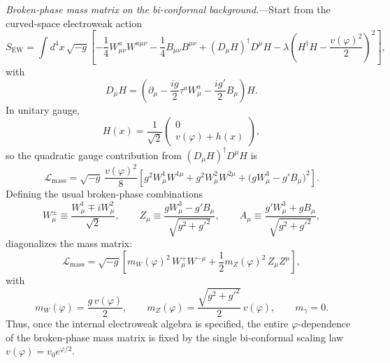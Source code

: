 \documentclass[aps,prd,onecolumn,superscriptaddress,nofootinbib,showpacs,12pt,notitlepage]{revtex4-2}
\begin{document}
\textit{Broken-phase mass matrix on the bi-conformal
background.}---Start from the curved-space electroweak action
\begin{equation}\label{eq:ew_action_bg}
  S_{\mathrm{EW}}
  = \int d^4x\,\sqrt{-g}\left[
      -\frac{1}{4}W^a_{\mu\nu}W^{a\mu\nu}
      -\frac{1}{4}B_{\mu\nu}B^{\mu\nu}
      + (D_\mu H)^\dagger D^\mu H
      - \lambda\!\left(H^\dagger H
        - \frac{v(\varphi)^2}{2}\right)^2
    \right],
\end{equation}
with
\begin{equation}\label{eq:ew_covariant_derivative}
  D_\mu H
  = \left(
      \partial_\mu
      - \frac{i g}{2}\tau^a W^a_\mu
      - \frac{i g'}{2} B_\mu
    \right)H .
\end{equation}
In unitary gauge,
\begin{equation}\label{eq:higgs_unitary_bg}
  H(x) = \frac{1}{\sqrt{2}}
  \begin{pmatrix}
    0\\
    v(\varphi) + h(x)
  \end{pmatrix},
\end{equation}
so the quadratic gauge contribution from
$(D_\mu H)^\dagger D^\mu H$ is
\begin{equation}\label{eq:ew_mass_matrix_bg}
  \mathcal{L}_{\mathrm{mass}}
  = \sqrt{-g}\,\frac{v(\varphi)^2}{8}\left[
      g^2 W_\mu^1 W^{1\mu}
      + g^2 W_\mu^2 W^{2\mu}
      + \bigl(g W_\mu^3 - g' B_\mu\bigr)^2
    \right].
\end{equation}
Defining the usual broken-phase combinations
\begin{equation}\label{eq:ew_broken_basis}
  W_\mu^\pm \equiv \frac{W_\mu^1 \mp iW_\mu^2}{\sqrt{2}},\qquad
  Z_\mu \equiv \frac{g W_\mu^3 - g' B_\mu}{\sqrt{g^2+g'^2}},\qquad
  A_\mu \equiv \frac{g' W_\mu^3 + g B_\mu}{\sqrt{g^2+g'^2}},
\end{equation}
diagonalizes the mass matrix:
\begin{equation}\label{eq:ew_mass_matrix_diag}
  \mathcal{L}_{\mathrm{mass}}
  = \sqrt{-g}\left[
      m_W(\varphi)^2\,W_\mu^+ W^{-\mu}
      + \frac{1}{2}m_Z(\varphi)^2\,Z_\mu Z^\mu
    \right],
\end{equation}
with
\begin{equation}\label{eq:ew_mass_closure}
  m_W(\varphi) = \frac{g\,v(\varphi)}{2},\qquad
  m_Z(\varphi) = \frac{\sqrt{g^2+g'^2}}{2}\,v(\varphi),\qquad
  m_\gamma = 0.
\end{equation}
Thus, once the internal electroweak algebra is specified,
the entire $\varphi$-dependence of the broken-phase mass matrix
is fixed by the single bi-conformal scaling law
$v(\varphi)=v_0 e^{\varphi/2}$.
\end{document}
